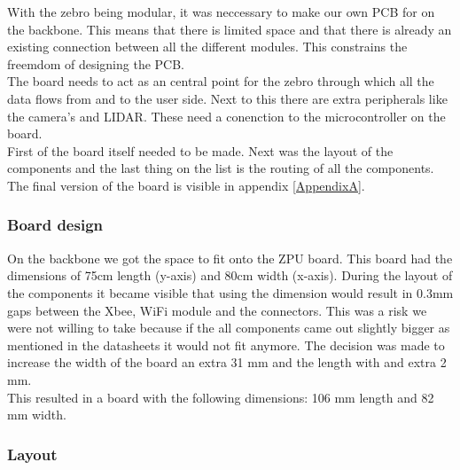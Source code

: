 \documentclass{article}
\begin{document}
With the zebro being modular, it was neccessary to make our own PCB for on the backbone. This means that there is limited space and that there is already an existing connection between all the different modules. This constrains the freemdom of designing the PCB.\\
The board needs to act as an central point for the zebro through which all the data flows from and to the user side. Next to this there are extra peripherals like the camera's and LIDAR. These need a conenction to the microcontroller on the board. \\
First of the board itself needed to be made. Next was the layout of the components and the last thing on the list is the routing of all the components. The final version of the board is visible in appendix \ref{AppendixA}.


\subsubsection{Board design}

On the backbone we got the space to fit onto the ZPU board. This board had the dimensions of 75cm length (y-axis) and 80cm width (x-axis). During the layout of the components it became visible that using the  dimension would result in 0.3mm gaps between the Xbee, WiFi module and the connectors. This was a risk we were not willing to take because if the all components came out slightly bigger as mentioned in the datasheets it would not fit anymore. The decision was made to increase the width of the board an extra 31 mm and the length with and extra 2 mm.\\
This resulted in a board with the following dimensions: 106 mm length and 82 mm width.

\subsubsection{Layout}
\end{document}
